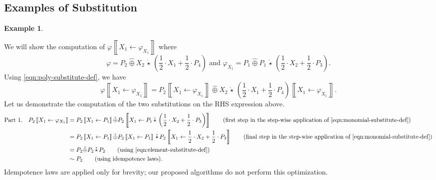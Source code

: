 \documentclass[10pt]{amsart}
\theoremstyle{plain}
\theoremstyle{definition}
\newtheorem{example}[lemma]{Example}
\providecommand{\cplus}[0]{\ensuremath{\hat{\oplus}}\xspace}
\providecommand{\cmult}[0]{\ensuremath{{\,\mathring{\star}\,}}\xspace}
\providecommand{\substitute}[2]{\ensuremath{\left\llbracket {#1} \gets {#2} \right\rrbracket}\xspace}
\begin{document}
\subsection{Examples of Substitution}
\label{subsec:sub-compute}



\begin{example}
\label{eg:1}    

We will show the computation of $\varphi\substitute{X_1}{\varphi_{X_1}}$ where
    $$ \varphi = P_2 \cplus X_2\cmult \left(\frac12\cdot X_1  + \frac12\cdot P_4\right)\text{ and }\varphi_{X_1} = P_1 \cplus P_1\cmult \left(\frac12\cdot X_2 + \frac12\cdot P_3\right).$$
Using \eqref{eqn:poly-substitute-def}, we have 
    $$\varphi\substitute{X_1}{\varphi_{X_1}} = P_2\substitute{X_1}{\varphi_{X_1}} \cplus X_2\cmult \left(\frac12\cdot X_1  + \frac12\cdot P_4\right)\substitute{X_1}{\varphi_{X_1}}.$$
Let us demonstrate the computation of the two substitutions on the RHS expression above. 
\begin{align*}
    \text{Part 1.} && P_2\substitute{X_1}{\varphi_{X_1}} 
        &= P_2\substitute{X_1}{P_1} \cplus P_2\substitute{X_1}{P_1\cmult \left(\frac12\cdot X_2 + \frac12\cdot P_3\right)}
            \tag{first step in the step-wise application of \eqref{eqn:monomial-substitute-def}}\\
        &&&= P_2\substitute{X_1}{P_1} \cplus P_2\substitute{X_1}{P_1}\cmult P_2\substitute{X_1}{\frac12\cdot X_2 + \frac12\cdot P_3}
            \tag{final step in the step-wise application of \eqref{eqn:monomial-substitute-def}}\\
        &&&= P_2 \cplus P_2 \cmult P_2
            \tag{using \eqref{eqn:element-substitute-def}}\\
        &&&\sim P_2 \tag{using idempotence laws}.
\end{align*}
Idempotence laws are applied only for brevity; our proposed algorithms do not perform this optimization. 



\end{example}
\end{document}
